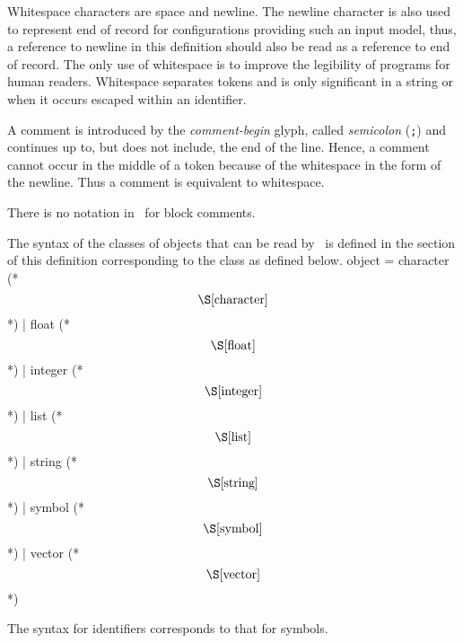 %
\begin{optDefinition}
Whitespace characters are space and
newline.  The newline character is also used to represent end of record for
configurations providing such an input model, thus, a reference to newline in
this definition should also be read as a reference to end of record.  The only
use of whitespace is to improve the legibility of programs for human readers.
Whitespace separates tokens and is only significant in a string or when it
occurs escaped within an identifier.

A comment is introduced by the {\em
    comment-begin} glyph,
called {\em semicolon} (\verb+;+) and continues up to, but does not include, the
end of the line.  Hence, a comment cannot occur in the middle of a token because
of the whitespace in the form of the newline.  Thus a comment is equivalent to
whitespace.
%
\begin{note}
    There is no notation in \eulisp\ for block comments.
\end{note}
\end{optDefinition}
%
\begin{optDefinition}
The syntax of the classes of objects that can be read by \eulisp\ is defined in
the section of this definition corresponding to the class as defined below.
%
\Syntax
\label{object-syntax}
\savesyntax\objectSyntax\vbox{\small\syntax
object
    = character (* \[\S\ref{character}\] *)
    | float (* \[\S\ref{float}\] *)
    | integer (* \[\S\ref{integer}\] *)
    | list (* \[\S\ref{list}\] *)
    | string (* \[\S\ref{string}\] *)
    | symbol (* \[\S\ref{symbol}\] *)
    | vector (* \[\S\ref{vector}\] *)
\endsyntax}

The syntax for identifiers 
 corresponds to that for symbols.
%
\end{optDefinition}
